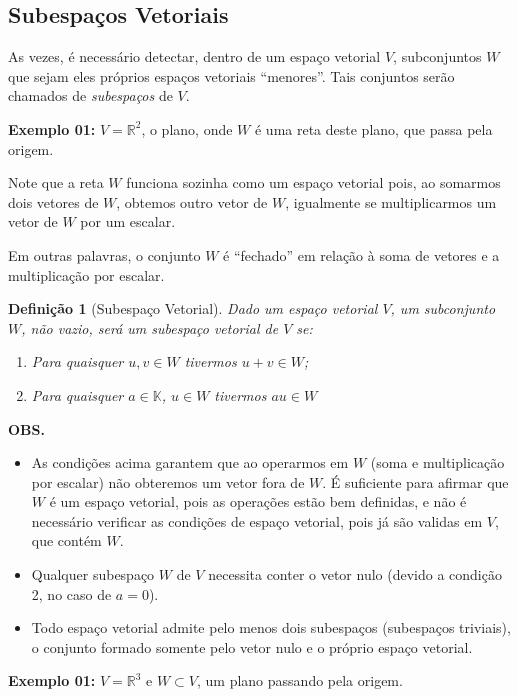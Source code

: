 \documentclass[oneside,a4paper,12pt]{article}
\newtheorem{definition}{Definição}[section]
\begin{document}
\subsection{Subespaços Vetoriais}

As vezes, é necessário detectar, dentro de um espaço vetorial $V$, subconjuntos $W$ que sejam eles próprios espaços vetoriais ``menores''. Tais conjuntos serão chamados de \emph{subespaços} de $V$.

{\bf Exemplo 01:} $V = \mathbb{R}^2$, o plano, onde $W$ é uma reta deste plano, que passa pela origem.

Note que a reta $W$ funciona sozinha como um espaço vetorial pois, ao somarmos dois vetores de $W$, obtemos outro vetor de $W$, igualmente se multiplicarmos um vetor de $W$ por um escalar.

Em outras palavras, o conjunto $W$ é ``fechado'' em relação à soma de vetores e a multiplicação por escalar.

\begin{definition}[Subespaço Vetorial]
	Dado um espaço vetorial $V$, um subconjunto $W$, não vazio, será um \emph{subespaço vetorial} de $V$ se:
	\begin{enumerate}
		\item Para quaisquer $u,v \in W$ tivermos $u + v \in W$;
		\item Para quaisquer $a \in \mathbb{K}$, $u \in W$ tivermos $au \in W$
	\end{enumerate}
\end{definition}

{\bf OBS.} 
\begin{itemize}
	\item As condições acima garantem que ao operarmos em $W$ (soma e multiplicação por escalar) não obteremos um vetor fora de $W$. É suficiente para afirmar que $W$ é um espaço vetorial, pois as operações estão bem definidas, e não é necessário verificar as condições de espaço vetorial, pois já são validas em $V$, que contém $W$.
	\item Qualquer subespaço $W$ de $V$ necessita conter o vetor nulo (devido a condição 2, no caso de $a=0$).
	\item Todo espaço vetorial admite pelo menos dois subespaços (subespaços triviais), o conjunto formado somente pelo vetor nulo e o próprio espaço vetorial.
\end{itemize}

{\bf Exemplo 01:} $V = \mathbb{R}^3$ e $W \subset V$, um plano passando pela origem.
\end{document}
